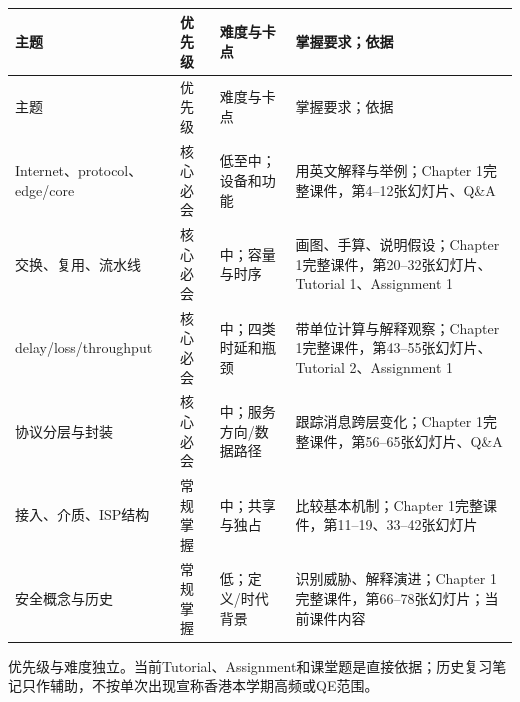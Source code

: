 \begingroup
\small\setlength{\tabcolsep}{3pt}
\renewcommand{\arraystretch}{1.22}
\begin{longtable}{@{}>{\raggedright\arraybackslash}p{}>{\raggedright\arraybackslash}p{}>{\raggedright\arraybackslash}p{}>{\raggedright\arraybackslash}p{}@{}}
\toprule
主题 & 优先级 & 难度与卡点 & 掌握要求；依据 \\
\midrule\endfirsthead
主题 & 优先级 & 难度与卡点 & 掌握要求；依据 \\
\midrule\endhead
\bottomrule\endfoot
Internet、protocol、edge/core & 核心必会 & 低至中；设备和功能 & 用英文解释与举例；Chapter 1完整课件，第4–12张幻灯片、Q\&A \\
交换、复用、流水线 & 核心必会 & 中；容量与时序 & 画图、手算、说明假设；Chapter 1完整课件，第20–32张幻灯片、Tutorial 1、Assignment 1 \\
delay/loss/throughput & 核心必会 & 中；四类时延和瓶颈 & 带单位计算与解释观察；Chapter 1完整课件，第43–55张幻灯片、Tutorial 2、Assignment 1 \\
协议分层与封装 & 核心必会 & 中；服务方向/数据路径 & 跟踪消息跨层变化；Chapter 1完整课件，第56–65张幻灯片、Q\&A \\
接入、介质、ISP结构 & 常规掌握 & 中；共享与独占 & 比较基本机制；Chapter 1完整课件，第11–19、33–42张幻灯片 \\
安全概念与历史 & 常规掌握 & 低；定义/时代背景 & 识别威胁、解释演进；Chapter 1完整课件，第66–78张幻灯片；当前课件内容 \\
\end{longtable}
\endgroup

优先级与难度独立。当前Tutorial、Assignment和课堂题是直接依据；历史复习笔记只作辅助，不按单次出现宣称香港本学期高频或QE范围。



